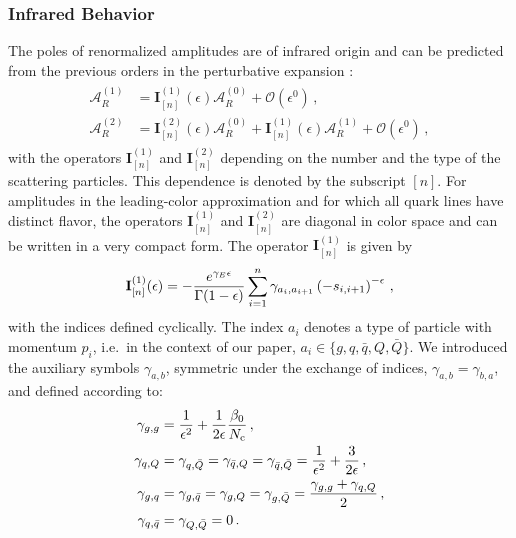 \subsubsection{Infrared Behavior}

The poles of renormalized amplitudes are of infrared origin and
can be predicted from the previous orders in the perturbative 
expansion 
\cite{Catani:1998bh,Sterman:2002qn,Becher:2009cu,Gardi:2009qi}:
\begin{align}
  \begin{split}\label{eq:catani}
    \mathcal{A}_R^{(1)}&=\mathbf{I}^{(1)}_{[n]}(\epsilon)
    \mathcal{A}_R^{(0)}+\mathcal{O}
    (\epsilon^0)\,,\\
    \mathcal{A}_R^{(2)}&=\mathbf{I}^{(2)}_{[n]}(\epsilon)\mathcal{A}_R^{(0)}+\mathbf{I}^{(1)}_{[n]}(\epsilon)
    \mathcal{A}_R^{(1)}+\mathcal{O}(\epsilon^0)\,,
  \end{split}
\end{align}
with the operators $\mathbf{I}^{(1)}_{[n]}$ and
$\mathbf{I}^{(2)}_{[n]}$ depending on the number and the type of
the scattering particles. This dependence is denoted by the 
subscript $[n]$.
For amplitudes in the leading-color approximation and for which
all quark lines have distinct flavor, the operators
$\mathbf{I}^{(1)}_{[n]}$ and $\mathbf{I}^{(2)}_{[n]}$ are 
diagonal in color space and can be written in a very compact
form. The operator $\mathbf{I}^{(1)}_{[n]}$ is given by
%
\begin{equation}
  \mathbf{I}^{(1)}_{[n]}(\epsilon)=-\frac{e^{\gamma_E\epsilon}}{\Gamma(1-\epsilon)}
  \sum_{i=1}^n\gamma_{a_i,a_{i+1}}
  \left( -s_{i,i+1}\right)^{-\epsilon}\,,
\end{equation}
with the indices defined cyclically.
The index $a_i$ denotes a type of particle with momentum $p_i$, i.e.\  in the context of our paper,
$a_i\in\{g,q,\bar q, Q, \bar Q\}$. We introduced the auxiliary symbols $\gamma_{a,b}$, 
symmetric under the exchange of indices, 
$\gamma_{a,b}=\gamma_{b,a}$, and defined according to:
\begin{align}
  \begin{split}
    \gamma_{g,g}&=\frac{1}{\epsilon^2}+\frac{1}{2\epsilon}
    \frac{\beta_0}{N_\mathrm{c}}\,, \\
    \gamma_{q,Q}&=\gamma_{q,\bar Q}=
    \gamma_{\bar q, Q}=\gamma_{\bar q, \bar Q} 
    =\frac{1}{\epsilon^2}+\frac{3}{2\epsilon}\,,\\
    \gamma_{g,q}&=\gamma_{g,\bar q}=
    \gamma_{g,Q}=\gamma_{g,\bar Q}=
    \frac{\gamma_{g,g}+\gamma_{q,Q}}{2}\,,\\
    \gamma_{q,\bar q}&=\gamma_{Q,\bar Q}=0\,.
  \end{split}
\end{align}
